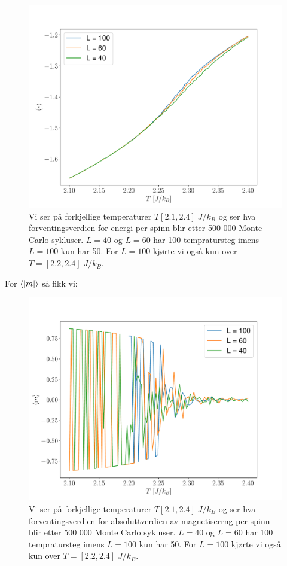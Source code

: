\documentclass[reprint,english,notitlepage]{revtex4-2}  %
\begin{document}
\begin{figure}[H]
\centering
\includegraphics[scale=0.4, trim=2.5cm 0 0 0 ]{../Images/epsPerTAll.pdf}
\caption{Vi ser på forkjellige temperaturer $T [2.1, 2.4] \; J/k_B$ og ser hva forventingsverdien for energi per spinn blir etter 500 000 Monte Carlo sykluser. $L = 40$ og $L = 60$ har 100 tempratursteg imens $L = 100$ kun har 50. For $L = 100$ kjørte vi også kun over $ T = [2.2, 2.4] \; J/k_B$.}
\label{Fig:epsAll}
\end{figure}

For $\expval{|m|}$ så fikk vi:

\begin{figure}[H]
\centering
\includegraphics[scale=0.4, trim=2.5cm 0 0 0 ]{../Images/mPerTAll.pdf}
\caption{Vi ser på forkjellige temperaturer $T [2.1, 2.4] \; J/k_B$ og ser hva forventingsverdien for absoluttverdien av magnetiserrng per spinn blir etter 500 000 Monte Carlo sykluser. $L = 40$ og $L = 60$ har 100 tempratursteg imens $L = 100$ kun har 50. For $L = 100$ kjørte vi også kun over $ T = [2.2, 2.4] \; J/k_B$.}
\label{Fig:mAll}
\end{figure}
\end{document}
